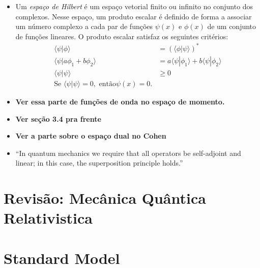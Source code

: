 \begin{itemize}
	\item Um \emph{espaço de Hilbert} é um espaço vetorial finito ou infinito no conjunto dos complexos. Nesse espaço, um produto escalar é definido de forma a associar um número complexo a cada par de funções $\psi(x)$ e $\phi(x)$ de um conjunto de funções lineares. O produto escalar satisfaz os seguintes critérios:
\begin{align}
	\langle\psi|\phi\rangle &= (\langle \phi|\psi\rangle)^* \\
	\langle\psi|a\phi_1 + b\phi_2\rangle &= a\langle\psi|\phi_1\rangle + b\langle\psi|\phi_2\rangle \\
	\langle\psi|\psi\rangle &\geq 0 \\
	\textrm{Se~}\langle\psi|\psi\rangle = 0,\textrm{~então} \psi(x) = 0.
\end{align}
	\item \textbf{Ver essa parte de funções de onda no espaço de momento.}
	\item \textbf{Ver seção 3.4 pra frente}
	\item \textbf{Ver a parte sobre o espaço dual no Cohen}
	\item ``In quantum mechanics we require that all operators be self-adjoint and linear; in this case, the superposition principle holds.''
\end{itemize}

\section{Revisão: Mecânica Quântica Relativistica}

\section{Standard Model}

